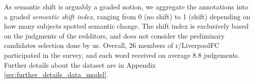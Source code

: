 As semantic shift is arguably a graded notion, we 
aggregate the annotations into a graded \emph{semantic shift index},
ranging from 0 (no shift) to 1 (shift) depending on how many subjects
spotted semantic change. The shift index is exclusively based
  on the judgments of the redditors, and does not consider the
  preliminary candidates selection done by us.  Overall, 26 members
of r/LiverpoolFC participated in the survey, and each word received on
average 8.8 judgements. 
  Further details about the dataset are in Appendix \ref{sec:further_details_data_model}. 


